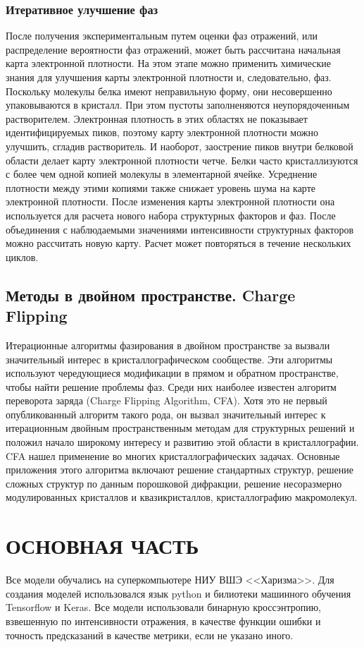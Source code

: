 \documentclass{article}
\begin{document}
\subsubsection{Итеративное улучшение фаз}
После получения экспериментальным путем оценки фаз отражений, или распределение вероятности фаз отражений, может быть рассчитана начальная карта электронной плотности. На этом этапе можно применить химические знания для улучшения карты электронной плотности и, следовательно, фаз. Поскольку молекулы белка имеют неправильную форму, они несовершенно упаковываются в кристалл. При этом пустоты заполненяются неупорядоченным растворителем. Электронная плотность в этих областях не показывает идентифицируемых пиков, поэтому карту электронной плотности можно улучшить, сгладив растворитель\cite{Wang1985}. И наоборот, заострение пиков внутри белковой области делает карту электронной плотности четче. Белки часто кристаллизуются с более чем одной копией молекулы в элементарной ячейке. Усреднение плотности между этими копиями также снижает уровень шума на карте электронной плотности. После изменения карты электронной плотности она используется для расчета нового набора структурных факторов и фаз. После объединения с наблюдаемыми значениями интенсивности структурных факторов можно рассчитать новую карту. Расчет может повторяться в течение нескольких циклов.

\subsection{Методы в двойном пространстве. Charge Flipping}
Итерационные алгоритмы фазирования в двойном пространстве за вызвали значительный интерес в кристаллографическом сообществе. Эти алгоритмы используют чередующиеся модификации в прямом и обратном пространстве, чтобы найти решение проблемы фаз. Среди них наиболее известен алгоритм переворота заряда (Charge Flipping Algorithm, CFA)\cite{ChargeFlipping}. 
Хотя это не первый опубликованный алгоритм такого рода, он вызвал значительный интерес к итерационным двойным пространственным методам для структурных решений и положил начало широкому интересу и развитию этой области в кристаллографии.
CFA нашел применение во многих кристаллографических задачах. Основные приложения этого алгоритма включают решение стандартных структур, решение сложных структур по данным порошковой дифракции, решение несоразмерно модулированных кристаллов и квазикристаллов, кристаллографию макромолекул\cite{Palatinus2013}.

\newpage
\section{ОСНОВНАЯ ЧАСТЬ}
Все модели обучались на суперкомпьютере НИУ ВШЭ <<Харизма>>. Для создания моделей использовался язык python и билиотеки машинного обучения Tensorflow и Keras. Все модели использовали бинарную кроссэнтропию, взвешенную по интенсивности отражения, в качестве функции ошибки и точность предсказаний в качестве метрики, если не указано иного.
  
\end{document}
